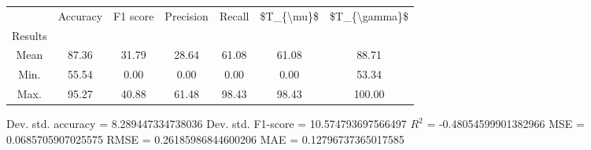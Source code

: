 \begin{tabular}{|c|c|c|c|c|c|c|}
\toprule
{} &  Accuracy &  F1 score &  Precision &  Recall &  \$T\_\{\textbackslash mu\}\$ &  \$T\_\{\textbackslash gamma\}\$ \\
Results &           &           &            &         &            &               \\
\hline
Mean    &     87.36 &     31.79 &      28.64 &   61.08 &      61.08 &         88.71 \\
Min.    &     55.54 &      0.00 &       0.00 &    0.00 &       0.00 &         53.34 \\
Max.    &     95.27 &     40.88 &      61.48 &   98.43 &      98.43 &        100.00 \\
\bottomrule
\end{tabular}

 Dev. std. accuracy = 8.289447334738036
 Dev. std. F1-score = 10.574793697566497
 $R^2$ = -0.48054599901382966
 MSE = 0.0685705907025575
 RMSE = 0.26185986844600206
 MAE = 0.12796737365017585
